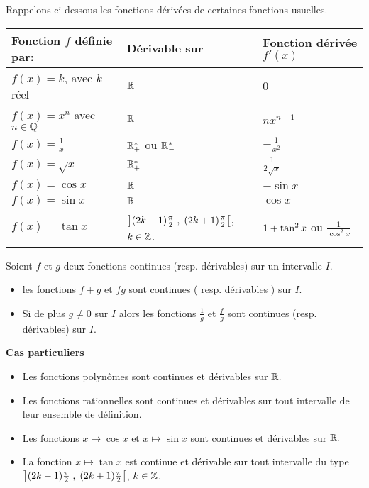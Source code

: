 Rappelons  ci-dessous les fonctions dérivées de certaines fonctions usuelles.
\medskip

\begin{tabularx}{\textwidth}{|X|X|X|}
\hline
\textbf{Fonction $f$ définie par:}  & \textbf{Dérivable sur} &\textbf{ Fonction dérivée $ f'(x) $ }  \\
\hline
$ f(x)=k$, avec $k$ réel  & $\mathbb{R}$ & 0 \\
\hline
$f(x)= x^{n} $  avec $n\in \mathbb{Q}$ &  $\mathbb{R}$  & $ nx^{n-1} $   \\
\hline
$f(x)= \frac{1}{x} $ &  $\mathbb{R}_+^*$ ou $\mathbb{R}_-^*$ & $ -\frac{1}{x^{2}} $\\
\hline
$f(x)= \sqrt{x} $ &  $\mathbb{R}_+^*$ &  $ \frac{1}{2\sqrt{x}} $\\
\hline
$f(x)= \cos x $  &  $\mathbb{R}$  & $ -\sin x $ \\
\hline
$f(x)= \sin x $   &  $\mathbb{R}$  & $ \cos x $\\
\hline
$f(x)= \tan x $  &  $\left](2k-1)\frac{\pi}{2} \;,\; (2k+1)\frac{\pi}{2}\right[$, $ k\in\mathbb{Z} $.  & $\small  1+\tan^{2}x $ ou $\frac{1}{\cos^{2} x} $ \\
\hline
\end{tabularx}



\begin{property}
Soient $f $ et  $ g$ deux fonctions continues (resp. dérivables) sur un intervalle $ I. $

\begin{itemize}
\item les fonctions $ f+g $ et $ fg $ sont continues ( resp. dérivables ) sur   $ I. $
\item  Si de plus $ g\neq0 $ sur  $ I $ alors les fonctions $\frac{1}{g} $ et  $\frac{f}{g} $ sont continues (resp. dérivables) sur $ I. $
\end{itemize}
\end{property}

\textbf{Cas particuliers}
\begin{itemize}
\item Les fonctions polynômes sont continues et dérivables sur $ \mathbb{R}. $ 
\item Les fonctions rationnelles sont continues et dérivables sur tout intervalle de leur ensemble de définition.
\item Les fonctions $x\mapsto\cos x $ et  $x\mapsto\sin x $ sont continues et dérivables sur $ \mathbb{R}. $
\item La fonction $x\mapsto\tan x $ est continue et dérivable sur tout intervalle du type $\left](2k-1)\frac{\pi}{2} \;,\; (2k+1)\frac{\pi}{2}\right[$, $ k\in\mathbb{Z} $.

\end{itemize}
